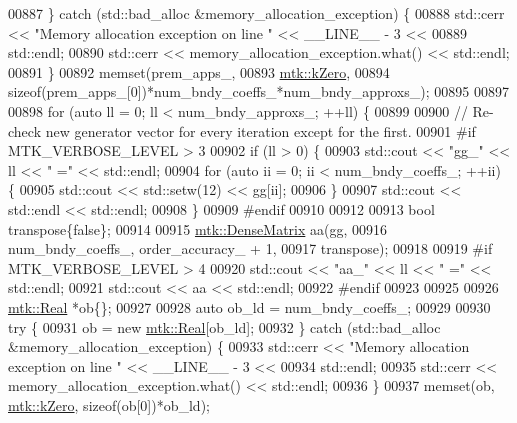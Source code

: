 \begin{DoxyCode}
{{00887   \} \textcolor{keywordflow}{catch} (std::bad\_alloc &memory\_allocation\_exception) \{
00888     std::cerr << \textcolor{stringliteral}{"Memory allocation exception on line "} << \_\_LINE\_\_ - 3 <<
00889 std::endl;
00890     std::cerr << memory\_allocation\_exception.what() << std::endl;
00891   \}
00892   memset(prem\_apps\_,
00893          \hyperlink{group__c01-roots_ga59a451a5fae30d59649bcda274fea271}{mtk::kZero},
00894          \textcolor{keyword}{sizeof}(prem\_apps\_[0])*num\_bndy\_coeffs\_*num\_bndy\_approxs\_);
00895 
00897 
00898   \textcolor{keywordflow}{for} (\textcolor{keyword}{auto} ll = 0; ll < num\_bndy\_approxs\_; ++ll) \{
00899 
00900     \textcolor{comment}{// Re-check new generator vector for every iteration except for the first.}
00901 \textcolor{preprocessor}{    #if MTK\_VERBOSE\_LEVEL > 3}
00902     \textcolor{keywordflow}{if} (ll > 0) \{
00903       std::cout << \textcolor{stringliteral}{"gg\_"} << ll << \textcolor{stringliteral}{" ="} << std::endl;
00904       \textcolor{keywordflow}{for} (\textcolor{keyword}{auto} ii = 0; ii < num\_bndy\_coeffs\_; ++ii) \{
00905         std::cout << std::setw(12) << gg[ii];
00906       \}
00907       std::cout << std::endl << std::endl;
00908     \}
00909 \textcolor{preprocessor}{    #endif}
00910 
00912 
00913     \textcolor{keywordtype}{bool} transpose\{\textcolor{keyword}{false}\};
00914 
00915     \hyperlink{classmtk_1_1DenseMatrix}{mtk::DenseMatrix} aa(gg,
00916                          num\_bndy\_coeffs\_, order\_accuracy\_ + 1,
00917                          transpose);
00918 
00919 \textcolor{preprocessor}{    #if MTK\_VERBOSE\_LEVEL > 4}
00920     std::cout << \textcolor{stringliteral}{"aa\_"} << ll << \textcolor{stringliteral}{" ="} << std::endl;
00921     std::cout << aa << std::endl;
00922 \textcolor{preprocessor}{    #endif}
00923 
00925 
00926     \hyperlink{group__c01-roots_gac080bbbf5cbb5502c9f00405f894857d}{mtk::Real} *ob\{\};
00927 
00928     \textcolor{keyword}{auto} ob\_ld = num\_bndy\_coeffs\_;
00929 
00930     \textcolor{keywordflow}{try} \{
00931       ob = \textcolor{keyword}{new} \hyperlink{group__c01-roots_gac080bbbf5cbb5502c9f00405f894857d}{mtk::Real}[ob\_ld];
00932     \} \textcolor{keywordflow}{catch} (std::bad\_alloc &memory\_allocation\_exception) \{
00933       std::cerr << \textcolor{stringliteral}{"Memory allocation exception on line "} << \_\_LINE\_\_ - 3 <<
00934         std::endl;
00935       std::cerr << memory\_allocation\_exception.what() << std::endl;
00936     \}
00937     memset(ob, \hyperlink{group__c01-roots_ga59a451a5fae30d59649bcda274fea271}{mtk::kZero}, \textcolor{keyword}{sizeof}(ob[0])*ob\_ld);
}}
\end{DoxyCode}
